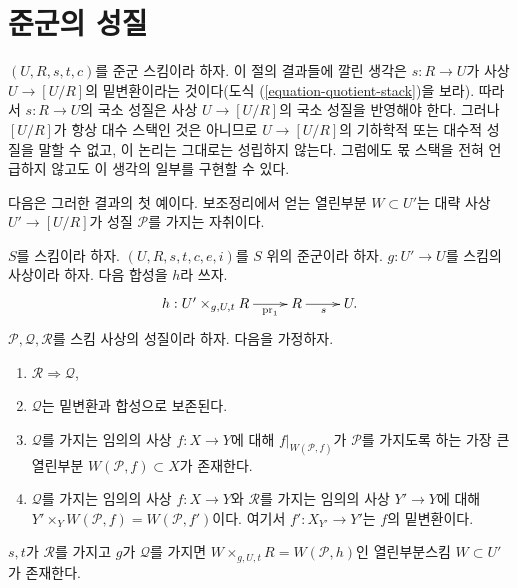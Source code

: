 \section{준군의 성질}
\label{section-technical-lemma}

\noindent
$(U, R, s, t, c)$를 준군 스킴이라 하자.
이 절의 결과들에 깔린 생각은 $s: R \to U$가 사상
$U \to [U/R]$의 밑변환이라는 것이다(도식
(\ref{equation-quotient-stack})을 보라).
따라서 $s : R \to U$의 국소 성질은 사상 $U \to [U/R]$의
국소 성질을 반영해야 한다. 그러나 $[U/R]$가 항상 대수 스택인 것은
아니므로 $U \to [U/R]$의 기하학적 또는 대수적 성질을 말할 수 없고,
이 논리는 그대로는 성립하지 않는다. 그럼에도 몫 스택을 전혀
언급하지 않고도 이 생각의 일부를 구현할 수 있다.

\medskip\noindent
다음은 그러한 결과의 첫 예이다. 보조정리에서 얻는 열린부분
$W \subset U'$는 대략 사상 $U' \to [U/R]$가 성질
$\mathcal{P}$를 가지는 자취이다.

\begin{lemma}
\label{lemma-local-source}
$S$를 스킴이라 하자.
$(U, R, s, t, c, e, i)$를 $S$ 위의 준군이라 하자.
$g : U' \to U$를 스킴의 사상이라 하자. 다음 합성을 $h$라 쓰자.
$$
\xymatrix{
h : U' \times_{g, U, t} R \ar[r]_-{\text{pr}_1} & R \ar[r]_s & U.
}
$$
$\mathcal{P}, \mathcal{Q}, \mathcal{R}$를 스킴 사상의 성질이라 하자.
다음을 가정하자.
\begin{enumerate}
\item $\mathcal{R} \Rightarrow \mathcal{Q}$,
\item $\mathcal{Q}$는 밑변환과 합성으로 보존된다.
\item $\mathcal{Q}$를 가지는 임의의 사상 $f : X \to Y$에 대해
$f|_{W(\mathcal{P}, f)}$가 $\mathcal{P}$를 가지도록 하는 가장 큰 열린부분
$W(\mathcal{P}, f) \subset X$가 존재한다.
\item $\mathcal{Q}$를 가지는 임의의 사상 $f : X \to Y$와
$\mathcal{R}$를 가지는 임의의 사상 $Y' \to Y$에 대해
$Y' \times_Y W(\mathcal{P}, f) = W(\mathcal{P}, f')$이다. 여기서
$f' : X_{Y'} \to Y'$는 $f$의 밑변환이다.
\end{enumerate}
$s, t$가 $\mathcal{R}$를 가지고 $g$가 $\mathcal{Q}$를 가지면
$W \times_{g, U, t} R = W(\mathcal{P}, h)$인 열린부분스킴
$W \subset U'$가 존재한다.
\end{lemma}

